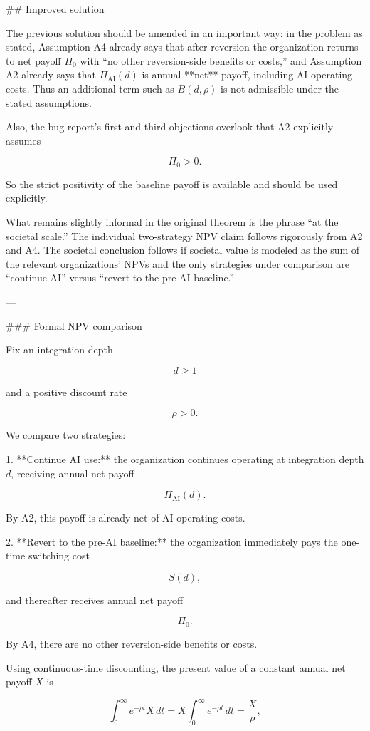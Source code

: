 ## Improved solution

The previous solution should be amended in an important way: in the problem as stated, Assumption A4 already says that after reversion the organization returns to net payoff \(\Pi_0\) with “no other reversion-side benefits or costs,” and Assumption A2 already says that \(\Pi_{\mathrm{AI}}(d)\) is annual **net** payoff, including AI operating costs. Thus an additional term such as \(B(d,\rho)\) is not admissible under the stated assumptions.

Also, the bug report’s first and third objections overlook that A2 explicitly assumes

\[
\Pi_0>0.
\]

So the strict positivity of the baseline payoff is available and should be used explicitly.

What remains slightly informal in the original theorem is the phrase “at the societal scale.” The individual two-strategy NPV claim follows rigorously from A2 and A4. The societal conclusion follows if societal value is modeled as the sum of the relevant organizations’ NPVs and the only strategies under comparison are “continue AI” versus “revert to the pre-AI baseline.”

---

### Formal NPV comparison

Fix an integration depth

\[
d\ge 1
\]

and a positive discount rate

\[
\rho>0.
\]

We compare two strategies:

1. **Continue AI use:** the organization continues operating at integration depth \(d\), receiving annual net payoff

\[
\Pi_{\mathrm{AI}}(d).
\]

By A2, this payoff is already net of AI operating costs.

2. **Revert to the pre-AI baseline:** the organization immediately pays the one-time switching cost

\[
S(d),
\]

and thereafter receives annual net payoff

\[
\Pi_0.
\]

By A4, there are no other reversion-side benefits or costs.

Using continuous-time discounting, the present value of a constant annual net payoff \(X\) is

\[
\int_0^\infty e^{-\rho t}X\,dt
=
X\int_0^\infty e^{-\rho t}\,dt
=
\frac{X}{\rho},
\]


